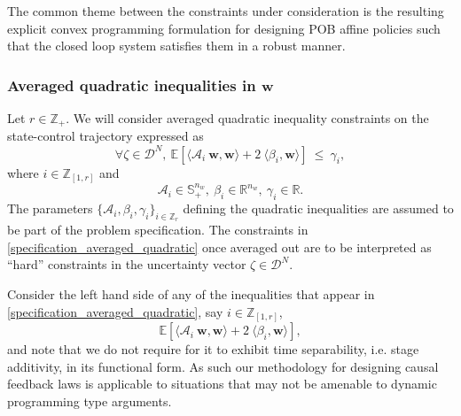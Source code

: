 \documentclass[letterpaper,11pt]{article}
\begin{document}
The common theme between the constraints 
under consideration is the resulting explicit convex programming formulation for designing POB affine policies such that the closed loop system satisfies them in a robust manner.  




\subsubsection{Averaged quadratic inequalities in $\mathbf{w}$}

Let $ r \in \mathbb{Z}_+$. We will consider averaged quadratic inequality constraints on the state-control trajectory  expressed as
\begin{equation}
\label{specification_averaged_quadratic}
\forall   \zeta \in \mathscr{D}^N, ~
\mathbb{E}[\langle \mathcal{A}_i ~  \mathbf{w},   \mathbf{w} \rangle + 2 ~ \langle \beta_i ,  \mathbf{w} \rangle ] ~ \leq~ \gamma_i, 
\end{equation}
where $i \in \mathbb{Z}_{[1,r]}$ and 
\begin{equation}
\label{parameters_averaged_quadratic}
\mathcal{A}_i \in \mathbb{S}_+^{n_w},~ \beta_i \in \mathbb{R}^{n_w }, ~\gamma_i \in \mathbb{R}.
\end{equation}
The parameters $ \{ \mathcal{A}_i, \beta_i, \gamma_i \}_{i \in
	\mathbb{Z}_r}$ defining the quadratic inequalities are assumed to be part of the problem specification.  The constraints in \eqref{specification_averaged_quadratic} once averaged out 
are to be interpreted as ``hard'' constraints in the 
uncertainty vector $ \zeta \in \mathscr{D}^N$.

Consider the left hand side of any of the inequalities that appear in \eqref{specification_averaged_quadratic}, say $ i \in \mathbb{Z}_{[1,r]}$, 
$$ \mathbb{E}[\langle \mathcal{A}_i ~  \mathbf{w},   \mathbf{w} \rangle + 2 ~ \langle \beta_i ,  \mathbf{w} \rangle ],$$  and note that we do not require for it 
to exhibit time separability, i.e. stage additivity, in its functional form.
As such our methodology for designing causal feedback laws is applicable to situations that may not be amenable to dynamic programming type arguments. 
\end{document}
